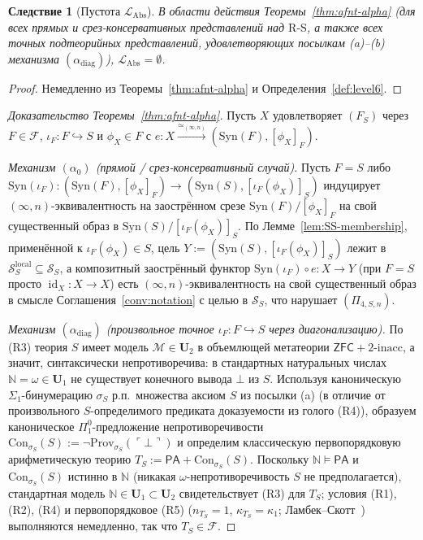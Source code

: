\documentclass[11pt]{article}
\theoremstyle{plain}
\newtheorem{corollary}[theorem]{Следствие}
\theoremstyle{definition}
\newcommand{\RS}{\mathrm{R\text{-}S}}
\newcommand{\cS}{\mathcal{S}}
\newcommand{\cF}{\mathcal{F}}
\newcommand{\cM}{\mathcal{M}}
\newcommand{\LAbs}{\mathcal{L}_{\mathrm{Abs}}}
\newcommand{\Syn}{\mathrm{Syn}}
\newcommand{\Con}{\mathrm{Con}}
\newcommand{\PA}{\mathsf{PA}}
\newcommand{\ZFC}{\mathsf{ZFC}}
\DeclareMathOperator{\id}{id}
\begin{document}
\begin{corollary}[Пустота $\LAbs$]\label{cor:level6-empty-alpha}
В области действия Теоремы~\ref{thm:afnt-alpha} (для всех прямых и срез-консервативных представлений над $\RS$, а также всех точных подтеорийных представлений, удовлетворяющих посылкам (a)--(b) механизма $(\alpha_{\mathrm{diag}})$), $\LAbs = \emptyset$.
\end{corollary}

\begin{proof}
Немедленно из Теоремы~\ref{thm:afnt-alpha} и Определения~\ref{def:level6}.
\end{proof}

\begin{proof}[Доказательство Теоремы~\ref{thm:afnt-alpha}]
Пусть $X$ удовлетворяет $(F_S)$ через $F \in \cF$, $\iota_F : F \hookrightarrow S$ и $\phi_X \in F$ с $e : X \xrightarrow{\simeq_{(\infty, n)}} (\Syn(F), [\phi_X]_F)$.

\emph{Механизм $(\alpha_0)$ (прямой / срез-консервативный случай).} Пусть $F = S$ либо $\Syn(\iota_F) : (\Syn(F), [\phi_X]_F) \to (\Syn(S), [\iota_F(\phi_X)]_S)$ индуцирует $(\infty, n)$-эквивалентность на заострённом срезе $\Syn(F)/[\phi_X]_F$ на свой существенный образ в $\Syn(S)/[\iota_F(\phi_X)]_S$. По Лемме~\ref{lem:SS-membership}, применённой к $\iota_F(\phi_X) \in S$, цель $Y := (\Syn(S), [\iota_F(\phi_X)]_S)$ лежит в $\cS_S^{\mathrm{local}} \subseteq \cS_S$, а композитный заострённый функтор $\Syn(\iota_F) \circ e : X \to Y$ (при $F = S$ просто $\id_X : X \to X$) есть $(\infty, n)$-эквивалентность на свой существенный образ в смысле Соглашения~\ref{conv:notation} с целью в $\cS_S$, что нарушает $(\Pi_{4, S, n})$.

\emph{Механизм $(\alpha_{\mathrm{diag}})$ (произвольное точное $\iota_F : F \hookrightarrow S$ через диагонализацию).} По (R3) теория $S$ имеет модель $\cM \in \mathbf{U}_2$ в объемлющей метатеории $\ZFC + 2\text{-inacc}$, а значит, синтаксически непротиворечива: в стандартных натуральных числах $\mathbb{N} = \omega \in \mathbf{U}_1$ не существует конечного вывода $\bot$ из $S$. Используя каноническую $\Sigma_1$-бинумерацию $\sigma_S$ р.п.\ множества аксиом $S$ из посылки (a) (в отличие от произвольного $S$-определимого предиката доказуемости из голого (R4)), образуем каноническое $\Pi_1^0$-предложение непротиворечивости $\Con_{\sigma_S}(S) := \neg\mathrm{Prov}_{\sigma_S}(\ulcorner \bot \urcorner)$ и определим классическую первопорядковую арифметическую теорию $T_S := \PA + \Con_{\sigma_S}(S)$. Поскольку $\mathbb{N} \models \PA$ и $\Con_{\sigma_S}(S)$ истинно в $\mathbb{N}$ (никакая $\omega$-непротиворечивость $S$ не предполагается), стандартная модель $\mathbb{N} \in \mathbf{U}_1 \subset \mathbf{U}_2$ свидетельствует (R3) для $T_S$; условия (R1), (R2), (R4) и первопорядковое (R5) ($n_{T_S} = 1$, $\kappa_{T_S} = \kappa_1$; Ламбек--Скотт~\cite{LambekScott1986}) выполняются немедленно, так что $T_S \in \cF$.


\end{proof}
\end{document}
